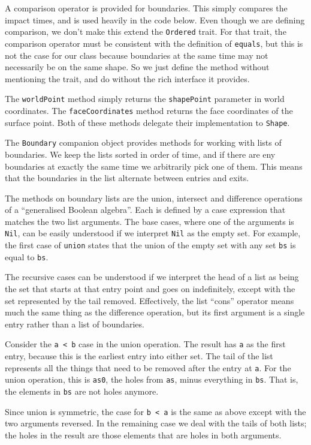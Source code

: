 A comparison operator is provided for boundaries.
This simply compares the impact times,
and is used heavily in the code below.
Even though we are defining comparison,
we don't make this extend the \verb!Ordered! trait.
For that trait, the comparison operator must be
consistent with the definition of \verb!equals!,
but this is not the case for our class
because boundaries at the same time may not necessarily be on the same shape.
So we just define the method without mentioning the trait,
and do without the rich interface it provides.

The \verb!worldPoint! method simply returns
the \verb!shapePoint! parameter in world coordinates.
The \verb!faceCoordinates! method
returns the face coordinates of the surface point.
Both of these methods delegate their implementation to \verb!Shape!.

The \verb!Boundary! companion object provides
methods for working with lists of boundaries.
We keep the lists sorted in order of time,
and if there are eny boundaries at exactly the same time
we arbitrarily pick one of them.
This means that the boundaries in the list alternate between entries and exits.

The methods on boundary lists are
the union, intersect and difference operations of
a ``generalised Boolean algebra''.
Each is defined by a case expression that matches the two list arguments.
The base cases, where one of the arguments is \verb!Nil!,
can be easily understood if we interpret \verb!Nil! as the empty set.
For example, the first case of \verb!union! states that
the union of the empty set with any set \verb!bs! is equal to \verb!bs!.

The recursive cases can be understood if we interpret the head of a list
as being the set that starts at that entry point and goes on indefinitely,
except with the set represented by the tail removed.
Effectively, the list ``cons'' operator means
much the same thing as the difference operation,
but its first argument is a single entry rather than a list of boundaries.

Consider the \verb!a < b! case in the union operation.
The result has \verb!a! as the first entry,
because this is the earliest entry into either set.
The tail of the list represents all the things that need to be removed
after the entry at \verb!a!.
For the union operation,
this is \verb!as0!, the holes from \verb!as!,
minus everything in \verb!bs!.
That is, the elements in \verb!bs! are not holes anymore.

Since union is symmetric,
the case for \verb!b < a! is the same as above
except with the two arguments reversed.
In the remaining case we deal with the tails of both lists;
the holes in the result are those elements that are holes in both arguments.

